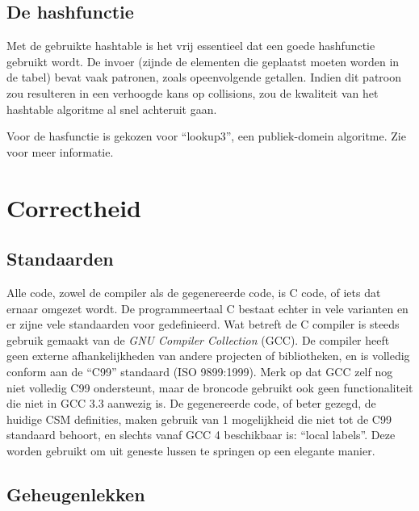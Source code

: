 \subsection{De hashfunctie} \label{sec:hashfunc}

Met de gebruikte hashtable is het vrij essentieel dat een goede hashfunctie gebruikt wordt. De invoer (zijnde de elementen die geplaatst moeten worden in de tabel) bevat vaak patronen, zoals opeenvolgende getallen. Indien dit patroon zou resulteren in een verhoogde kans op collisions, zou de kwaliteit van het hashtable algoritme al snel achteruit gaan.

Voor de hasfunctie is gekozen voor ``lookup3'', een publiek-domein algoritme. Zie \cite{hashing} voor meer informatie.

\section{Correctheid} \label{sec:correctheid}

\subsection{Standaarden} \label{sec:standards}

Alle code, zowel de compiler als de gegenereerde code, is C code, of iets dat ernaar omgezet wordt. De programmeertaal C bestaat echter in vele varianten en er zijne vele standaarden voor gedefinieerd. Wat betreft de C compiler is steeds gebruik gemaakt van de {\em GNU Compiler Collection} (GCC). De compiler heeft geen externe afhankelijkheden van andere projecten of bibliotheken, en is volledig conform aan de ``C99'' standaard (ISO 9899:1999). Merk op dat GCC zelf nog niet volledig C99 ondersteunt, maar de broncode gebruikt ook geen functionaliteit die niet in GCC 3.3 aanwezig is. De gegenereerde code, of beter gezegd, de huidige CSM definities, maken gebruik van 1 mogelijkheid die niet tot de C99 standaard behoort, en slechts vanaf GCC 4 beschikbaar is: ``local labels''. Deze worden gebruikt om uit geneste lussen te springen op een elegante manier.

\subsection{Geheugenlekken} \label{sec:memleaks}


